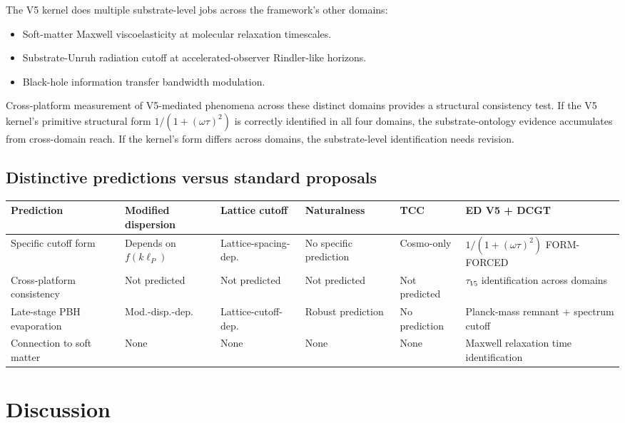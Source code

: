 \documentclass[11pt,a4paper]{article}
\begin{document}
The V5 kernel does multiple substrate-level jobs across the framework's other domains:
\begin{itemize}[noitemsep]
\item Soft-matter Maxwell viscoelasticity at molecular relaxation timescales.
\item Substrate-Unruh radiation cutoff at accelerated-observer Rindler-like horizons.
\item Black-hole information transfer bandwidth modulation.
\end{itemize}

Cross-platform measurement of V5-mediated phenomena across these distinct domains provides a structural consistency test. If the V5 kernel's primitive structural form $1/(1+(\omega\tau)^{2})$ is correctly identified in all four domains, the substrate-ontology evidence accumulates from cross-domain reach. If the kernel's form differs across domains, the substrate-level identification needs revision.

\subsection{Distinctive predictions versus standard proposals}

\begin{center}
\footnotesize
\begin{tabular}{p{}p{}p{}p{}p{}p{}}
\toprule
\textbf{Prediction} & \textbf{Modified dispersion} & \textbf{Lattice cutoff} & \textbf{Naturalness} & \textbf{TCC} & \textbf{ED V5 + DCGT} \\
\midrule
Specific cutoff form & Depends on $f(k\ell_P)$ & Lattice-spacing-dep. & No specific prediction & Cosmo-only & $1/(1+(\omega\tau)^{2})$ FORM-FORCED \\
Cross-platform consistency & Not predicted & Not predicted & Not predicted & Not predicted & $\tau_{V5}$ identification across domains \\
Late-stage PBH evaporation & Mod.-disp.-dep. & Lattice-cutoff-dep. & Robust prediction & No prediction & Planck-mass remnant + spectrum cutoff \\
Connection to soft matter & None & None & None & None & Maxwell relaxation time identification \\
\bottomrule
\end{tabular}
\end{center}

\section{Discussion}
\end{document}
